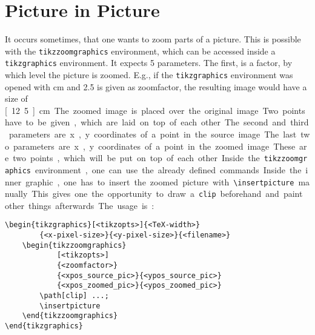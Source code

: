 \documentclass{scrartcl}
\begin{document}
\section{Picture in Picture}
It occurs sometimes, that one wants to zoom parts of a picture.
This is possible with the \lstinline+tikzzoomgraphics+ environment, which can be accessed inside a \lstinline+tikzgraphics+ environment.
It expects 5 parameters.
The first, is a factor, by which level the picture is zoomed.
E.g., if the \lstinline+tikzgraphics+ environment was opened with \unit[5]{cm} and 2.5 is given as zoomfactor, the resulting image would have a size of \unit[12.5]{cm}.
The zoomed image is placed over the original image.
Two points have to be given, which are laid on top of each other.
The second and third parameters are x,y coordinates of a point in the source image.
The last two parameters are x,y coordinates of a point in the zoomed image.
These are two points, which will be put on top of each other.

Inside the \lstinline+tikzzoomgraphics+ environment, one can use the already defined commands.
Inside the inner graphic, one has to insert the zoomed picture with \lstinline+\insertpicture+ manually.
This gives one the opportunity to draw a \lstinline+clip+ beforehand and paint other things afterwards.
The usage is:

\begin{lstlisting}
\begin{tikzgraphics}[<tikzopts>]{<TeX-width>}
		{<x-pixel-size>}{<y-pixel-size>}{<filename>}
	\begin{tikzzoomgraphics}
			[<tikzopts>]
			{<zoomfactor>}
			{<xpos_source_pic>}{<ypos_source_pic>}
			{<xpos_zoomed_pic>}{<ypos_zoomed_pic>}
		\path[clip] ...;
		\insertpicture
	\end{tikzzoomgraphics}
\end{tikzgraphics}
\end{lstlisting}
\end{document}
